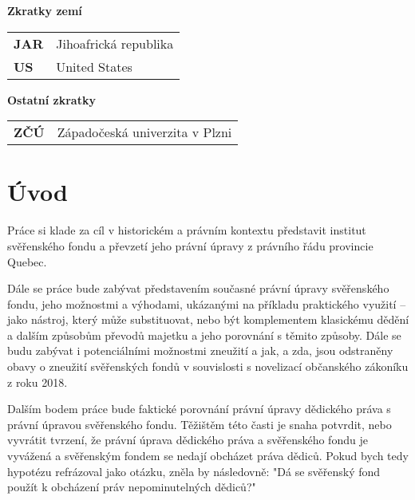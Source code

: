 \documentclass{article}
\begin{document}
\vspace{5 mm}

\textbf{Zkratky zemí}

\vspace{5 mm}

\begin{tabular}{p{3cm}p{8cm}}
\textbf{JAR} & Jihoafrická republika	 \\
\textbf{US} & United States \\
\end{tabular}

\vspace{5 mm}

\textbf{Ostatní zkratky}

\vspace{5 mm}

\begin{tabular}{p{3cm}p{8cm}}
\textbf{ZČÚ} & Západočeská univerzita v Plzni \\
\end{tabular}


\newpage
  
\section{Úvod}

Práce si klade za cíl v historickém a právním kontextu představit institut svěřenského fondu a převzetí jeho právní úpravy z právního řádu provincie Quebec.\\
\linebreak

\indent Dále se práce bude zabývat představením současné právní úpravy svěřens\-kého fondu, jeho možnostmi a výhodami, ukázanými na příkladu praktického využití – jako nástroj, který může substituovat, nebo být komplementem klasickému dědění a dalším způsobům převodů majetku a jeho porovnání s těmito způsoby. Dále se budu zabývat i potenciálními možnostmi zneužití a jak, a zda, jsou odstraněny obavy o zneužití svěřenských fondů v souvislosti s novelizací občanského zákoníku z roku 2018.\\
\linebreak

\indent Dalším bodem práce bude faktické porovnání právní úpravy dědického práva s právní úpravou svěřenského fondu. Těžištěm této časti je snaha potvrdit, nebo vyvrátit tvrzení, že právní úprava dědického práva a svěřenského fondu je vyvážená a svěřenským fondem se nedají obcházet práva dědiců. Pokud bych tedy hypotézu refrázoval jako otázku, zněla by následovně: "Dá se svěřenský fond použít k obcházení práv nepominutelných dědiců?"\\
\linebreak
\end{document}
